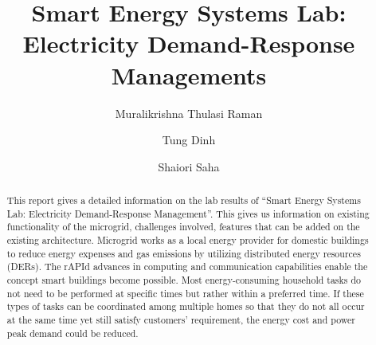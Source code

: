 \documentclass[runningheads]{llncs}
\begin{document}
%
\title{Smart Energy Systems Lab: Electricity Demand-Response Managements}

\author{Muralikrishna Thulasi Raman \and
Tung Dinh \and
Shaiori Saha}

%
\maketitle              %
%
\begin{abstract}
This report gives a detailed information on the lab results of ``Smart Energy Systems Lab: Electricity Demand-Response Management''. This gives us information on existing functionality of the microgrid, challenges involved, features that can be added on the existing architecture. Microgrid works as a local energy provider for domestic buildings to reduce energy expenses and gas emissions by utilizing distributed energy resources (DERs). The rAPId advances in computing and communication capabilities enable the concept smart buildings become possible. Most energy-consuming household tasks do not need to be performed at specific times but rather within a preferred time. If these types of tasks can be coordinated among multiple homes so that they do not all occur at the same time yet still satisfy customers’ requirement, the energy cost and power peak demand could be reduced.  
\end{abstract}
\end{document}
